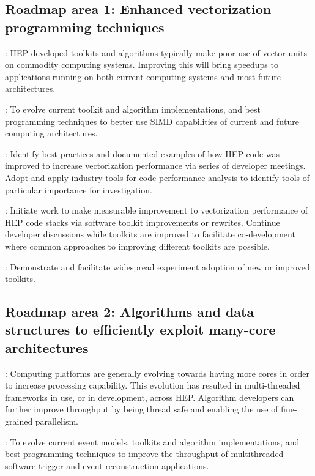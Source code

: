 \subsection{Roadmap area 1: Enhanced vectorization programming techniques}
: HEP developed toolkits and algorithms typically make poor use of vector units on commodity computing systems. Improving this will bring speedups to applications running on both current computing systems and most future architectures.

: To evolve current toolkit and algorithm implementations, and best programming techniques to better use SIMD capabilities of current and future computing architectures.

\vskip 0.5cm
: Identify best practices and documented examples of how HEP code was improved to increase vectorization performance via series of developer meetings. Adopt and apply industry tools for code performance analysis to identify tools of particular importance for investigation.

\vskip 0.5cm
: Initiate work to make measurable improvement to vectorization performance of HEP code stacks via software toolkit improvements or rewrites. Continue developer discussions while toolkits are improved to facilitate co-development where common approaches to improving different toolkits are possible. 

\vskip 0.5cm
: Demonstrate and facilitate widespread experiment adoption of new or improved toolkits.

\subsection{Roadmap area 2: Algorithms and data structures to efficiently exploit many-core architectures}
: Computing platforms are generally evolving towards having more cores in order to increase processing capability. This evolution has resulted in multi-threaded frameworks in use, or in development, across HEP. Algorithm developers can further improve throughput by being thread safe and enabling the use of fine-grained parallelism. 

\vskip 0.5cm
: To evolve current event models, toolkits and algorithm implementations, and best programming techniques to improve the throughput of multithreaded software trigger and event reconstruction applications.


